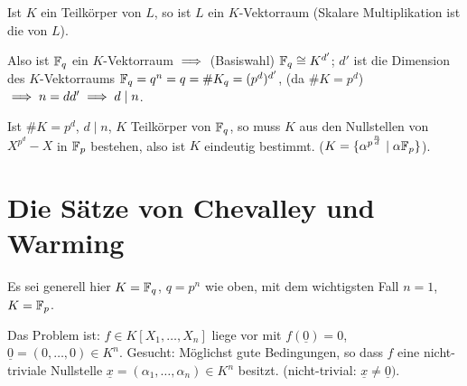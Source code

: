 \documentclass[a4paper,twoside,DIV15,BCOR12mm]{scrbook}
\begin{document}

\begin{beweis}
\begin{bemerkung}
Ist $K$ ein Teilkörper von $L$, so ist $L$ ein $K$-Vektorraum (Skalare Multiplikation ist die von $L$). 
\end{bemerkung}
Also ist $\mathbb{F}_q$ ein $K$-Vektorraum $\implies$ (Basiswahl) $\mathbb{F}_q \cong K^{d'}$; $d'$ ist die Dimension des $K$-Vektorraums $\mathbb{F}_q = q^n= q=\#K_q=(p^d)^{d'}$, (da $\#K=p^d$) $\implies n= dd' \implies d\mid n$. 

Ist $\#K=p^d$, $d\mid n$, $K$ Teilkörper von $\mathbb{F}_q$, so muss $K$ aus den Nullstellen von $X^{p^d}-X$ in $\mathbb{F}_p$ bestehen, also ist $K$ eindeutig bestimmt. ($K=\{\alpha^{p^{\frac n d}}\mid \alpha \mathbb{F}_p\}$).
\end{beweis}

\section{Die Sätze von Chevalley und Warming}

Es sei generell hier $K=\mathbb{F}_q$, $q=p^n$ wie oben, mit dem wichtigsten Fall $n=1$, $K=\mathbb{F}_p$.

Das Problem ist: $f\in K[X_1,\ldots,X_n]$ liege vor mit $f(\underline 0) = 0$, $\underline0 = (0,\ldots,0)\in K^n$. Gesucht: Möglichst gute Bedingungen, so dass $f$ eine nicht-triviale Nullstelle $\underline x = (\alpha_1,\ldots,\alpha_n) \in K^n$ besitzt. (nicht-trivial: $\underline x \ne \underline 0)$.
\end{document}
